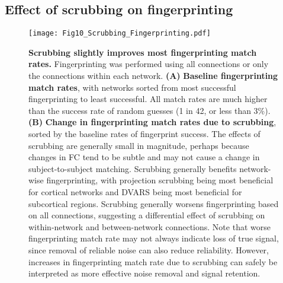 \documentclass{article}
\begin{document}



\subsection{Effect of scrubbing on fingerprinting}

\begin{figure}
    \centering
    \texttt{[image: Fig10\_Scrubbing\_Fingerprinting.pdf]}
    \caption{\small \textbf{Scrubbing slightly improves most fingerprinting match rates.} Fingerprinting was performed using all connections or only the connections within each network. \textbf{(A)} \textbf{Baseline fingerprinting match rates}, with networks sorted from most successful fingerprinting to least successful. %
    All match rates are much higher than the success rate of random guesses (1 in 42, or less than 3\%). \textbf{(B)} \textbf{Change in fingerprinting match rates due to scrubbing}, sorted by the baseline rates of fingerprint success. The effects of scrubbing are generally small in magnitude, perhaps because changes in FC tend to be subtle and may not cause a change in subject-to-subject matching. Scrubbing generally benefits network-wise fingerprinting, with projection scrubbing being most beneficial for cortical networks and DVARS being most beneficial for subcortical regions. Scrubbing generally worsens fingerprinting based on all connections, suggesting a differential effect of scrubbing on within-network and between-network connections. Note that worse fingerprinting match rate may not always indicate loss of true signal, since removal of reliable noise can also reduce reliability. However, increases in fingerprinting match rate due to scrubbing can safely be interpreted as more effective noise removal and signal retention.}
    \label{fig:Fingerprint}
\end{figure}
\end{document}
